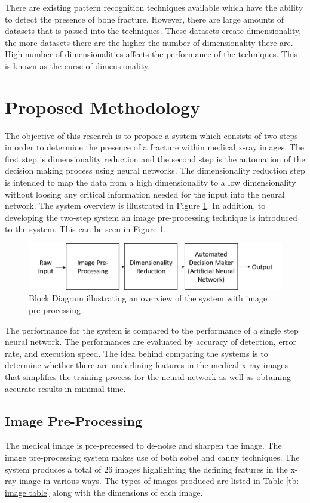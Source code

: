 \documentclass[11pt,twocolumn]{witseiepaper}
\begin{document}
	There are existing pattern recognition techniques available which have the ability to detect the presence of bone fracture. However, there are large amounts of datasets that is passed into the techniques. These datasets create dimensionality, the more datasets there are the higher the number of dimensionality there are. High number of dimensionalities affects the performance of the techniques. This is known as the curse of dimensionality. 
	
	\section{Proposed Methodology}
	The objective of this research is to propose a system which consists of two steps in order to determine the presence of a fracture within medical x-ray images. The first step is dimensionality reduction and the second step is the automation of the decision making process using neural networks. The dimensionality reduction step is intended to map the data from a high dimensionality to a low dimensionality without loosing any critical information needed for the input into the neural network. The system overview is illustrated in Figure \ref{fig:system overview_2}.
	\newline
	In addition, to developing the two-step system an image pre-processing technique is introduced to the system. This can be seen in Figure \ref{fig:system overview_2}.
	\begin{figure}[!h]
		\centering
		\includegraphics[scale=0.23]{system_overview_2.png}
		\caption{Block Diagram illustrating an overview of the system with image pre-processing }
		\label{fig:system overview_2}
	\end{figure}
	\newline
	The performance for the system is compared to the performance of a single step neural network. The performances are evaluated by accuracy of detection, error rate, and execution speed. The idea behind comparing the systems is to determine whether there are underlining features in the medical x-ray images that simplifies the training process for the neural network as well as obtaining accurate results in minimal time.
	
	\subsection{Image Pre-Processing}
	The medical image is pre-precessed to de-noise and sharpen the image. The image pre-processing system makes use of both sobel and canny techniques. The system produces a total of 26 images highlighting the defining features in the x-ray image in various ways. The types of images produced are listed in Table \ref{tb: image table} along with the dimensions of each image.
	
\end{document}
